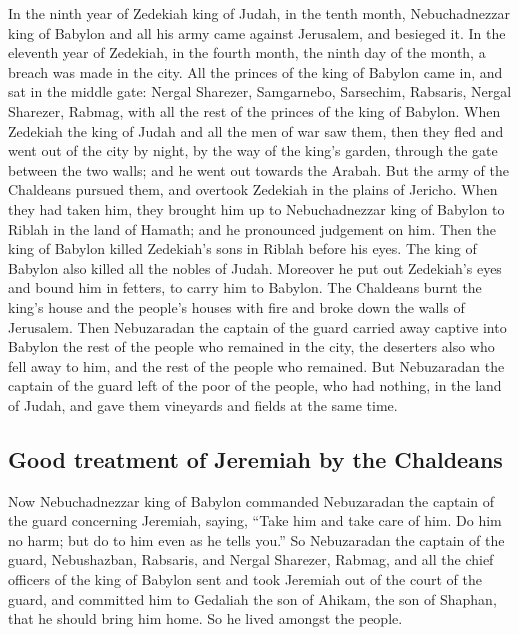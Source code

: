  In the ninth year of Zedekiah king of Judah, in the tenth
month, Nebuchadnezzar king of Babylon and all his army came against
Jerusalem, and besieged it.  In the eleventh year of
Zedekiah, in the fourth month, the ninth day of the month, a breach was
made in the city.  All the princes of the king of Babylon
came in, and sat in the middle gate: Nergal Sharezer, Samgarnebo,
Sarsechim, Rabsaris, Nergal Sharezer, Rabmag, with all the rest of the
princes of the king of Babylon.  When Zedekiah the king of
Judah and all the men of war saw them, then they fled and went out of
the city by night, by the way of the king's garden, through the gate
between the two walls; and he went out towards the Arabah.
 But the army of the Chaldeans pursued them, and overtook
Zedekiah in the plains of Jericho. When they had taken him, they brought
him up to Nebuchadnezzar king of Babylon to Riblah in the land of
Hamath; and he pronounced judgement on him.  Then the king
of Babylon killed Zedekiah's sons in Riblah before his eyes. The king of
Babylon also killed all the nobles of Judah.  Moreover he
put out Zedekiah's eyes and bound him in fetters, to carry him to
Babylon.  The Chaldeans burnt the king's house and the
people's houses with fire and broke down the walls of Jerusalem.
 Then Nebuzaradan the captain of the guard carried away
captive into Babylon the rest of the people who remained in the city,
the deserters also who fell away to him, and the rest of the people who
remained.  But Nebuzaradan the captain of the guard left
of the poor of the people, who had nothing, in the land of Judah, and
gave them vineyards and fields at the same time.

\hypertarget{good-treatment-of-jeremiah-by-the-chaldeans}{%
\subsection{Good treatment of Jeremiah by the
Chaldeans}\label{good-treatment-of-jeremiah-by-the-chaldeans}}

 Now Nebuchadnezzar king of Babylon commanded Nebuzaradan
the captain of the guard concerning Jeremiah, saying, 
``Take him and take care of him. Do him no harm; but do to him even as
he tells you.''  So Nebuzaradan the captain of the guard,
Nebushazban, Rabsaris, and Nergal Sharezer, Rabmag, and all the chief
officers of the king of Babylon  sent and took Jeremiah
out of the court of the guard, and committed him to Gedaliah the son of
Ahikam, the son of Shaphan, that he should bring him home. So he lived
amongst the people.

